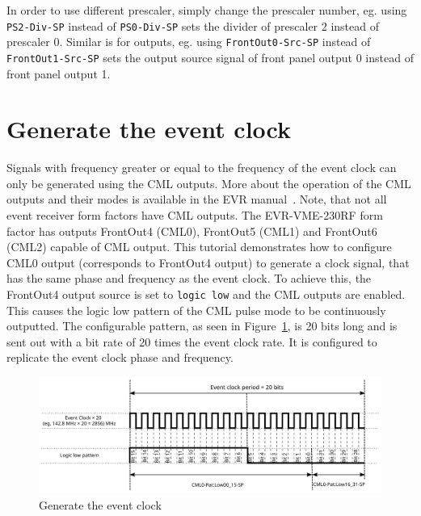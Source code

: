 \documentclass[12pt,a4paper]{article}
\begin{document}
In order to use different prescaler, simply change the prescaler number, eg. using \texttt{PS2-Div-SP} instead of \texttt{PS0-Div-SP} sets the divider of prescaler 2 instead of prescaler 0.
Similar is for outputs, eg. using \texttt{FrontOut0-Src-SP} instead of \texttt{FrontOut1-Src-SP} sets the output source signal of front panel output 0 instead of front panel output 1.

\section{Generate the event clock}\label{sec:generate_event_clock}
Signals with frequency greater or equal to the frequency of the event clock can only be generated using the CML outputs. More about the operation of the CML outputs and their modes is available in the EVR manual~\cite{evr_manual}. Note, that not all event receiver form factors have CML outputs. The EVR-VME-230RF form factor has outputs FrontOut4 (CML0), FrontOut5 (CML1) and FrontOut6 (CML2) capable of CML output. This tutorial demonstrates how to configure CML0 output (corresponds to FrontOut4 output) to generate a clock signal, that has the same phase and frequency as the event clock. To achieve this, the FrontOut4 output source is set to \texttt{logic low} and the CML outputs are enabled. This causes the logic low pattern of the CML pulse mode to be continuously outputted. The configurable pattern, as seen in Figure~\ref{fig:gen_evt_clk}, is 20 bits long and is sent out with a bit rate of 20 times the event clock rate. It is configured to replicate the event clock phase and frequency.

\begin{figure}[H]
	\centering
	\includegraphics[width=\columnwidth]{./img/gen_evt_clk}
	\caption{Generate the event clock}
	\label{fig:gen_evt_clk}
\end{figure}
\end{document}
